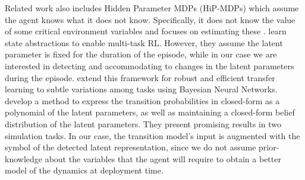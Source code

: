 \documentclass[Afour,sageh,times]{sagej}
\theoremstyle{lemma}
\begin{document}
Related work also includes Hidden Parameter MDPs (HiP-MDPs) which assume the agent knows what it does not know. Specifically, it does not know the value of some critical environment variables and focuses on estimating these \cite[]{doshi2016hidden}. \cite{zhang2020learning} learn state abstractions to enable multi-task RL. However, they assume the latent parameter is fixed for the duration of the episode, while in our case we are interested in detecting and accommodating to changes in the latent parameters during the episode. \cite{killian2017robust} extend this framework for robust and efficient transfer learning to subtle variations among tasks using Bayesian Neural Networks. \cite{costen2023planning} develop a method to express the transition probabilities in closed-form as a polynomial of the latent parameters, as well as maintaining a closed-form belief distribution of the latent parameters. They present promising results in two simulation tasks. In our case, the transition model's input is augmented with the symbol of the detected latent representation, since we do not assume prior-knowledge about the variables that the agent will require to obtain a better model of the dynamics at deployment time.
\end{document}
